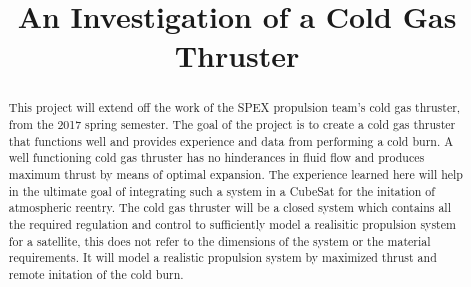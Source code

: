 \documentclass[conference]{IEEEtran} %
\title{An Investigation of a Cold Gas Thruster}
\author{
  \IEEEauthorblockN{%
    James~Emerson~Parkus\IEEEauthorrefmark{1},  %
    David~Breen\IEEEauthorrefmark{2}
  }
  \IEEEauthorblockA{%
    RIT Space Exploration, Rochester Institute of Technology \\ %
    Rochester, N.Y. \\
    Email:
    \IEEEauthorrefmark{1}jep7631@rit.edu,
    \IEEEauthorrefmark{2}djb1410@rit.edu
}


}
\begin{document}
\maketitle%

\begin{abstract}
  This project will extend off the work of the SPEX propulsion team's cold gas thruster, from the 2017 spring semester. The goal of the project is
  to create a cold gas thruster that functions well and provides experience and data from performing a cold burn. A well functioning cold gas thruster has no
  hinderances in fluid flow and produces maximum thrust by means of optimal expansion.
  The experience learned here will help in the ultimate goal of integrating such a system in a CubeSat for the initation of atmospheric reentry. The cold gas thruster will be a
  closed system which contains all the required regulation and control to sufficiently model a realisitic propulsion system for a satellite, this does not refer
  to the dimensions of the system or the material requirements. It will model a realistic propulsion system by maximized thrust and remote initation of
  the cold burn.

\end{abstract}
\end{document}
